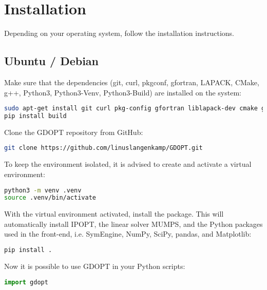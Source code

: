 \documentclass[12pt]{article}
\begin{document}
\section{Installation}

Depending on your operating system, follow the installation instructions.

\subsection{Ubuntu / Debian}

\begin{mdframed}[backgroundcolor=gray!10, roundcorner=10pt,
		linewidth=1pt]

	Make sure that the dependencies (git, curl, pkgconf, gfortran, LAPACK, CMake, g++,
	Python3, Python3-Venv, Python3-Build) are installed on the system:

	\begin{lstlisting}[language=bash]
sudo apt-get install git curl pkg-config gfortran liblapack-dev cmake g++ python3 python3-venv
pip install build
\end{lstlisting}

	Clone the GDOPT repository from GitHub:

	\begin{lstlisting}[language=bash]
git clone https://github.com/linuslangenkamp/GDOPT.git
\end{lstlisting}

	To keep the environment isolated, it is advised to create and activate a
	virtual environment:

	\begin{lstlisting}[language=bash]
python3 -m venv .venv
source .venv/bin/activate
\end{lstlisting}

	With the virtual environment activated, install the package. This will
	automatically install
	IPOPT\cite{wachter2006implementation}, the linear solver
	MUMPS\cite{amestoy2001fully}, and the Python packages used in the front-end,
	i.e. SymEngine\cite{symengine}, NumPy\cite{harris2020array},
	SciPy\cite{virtanen2020scipy}, pandas\cite{mckinney2010data}, and
	Matplotlib\cite{hunter2007matplotlib}:

	\begin{lstlisting}[language=bash]
pip install .
\end{lstlisting}

	Now it is possible to use GDOPT in your Python scripts:
	\begin{lstlisting}[language=python]
import gdopt
\end{lstlisting}


\end{mdframed}
\end{document}
